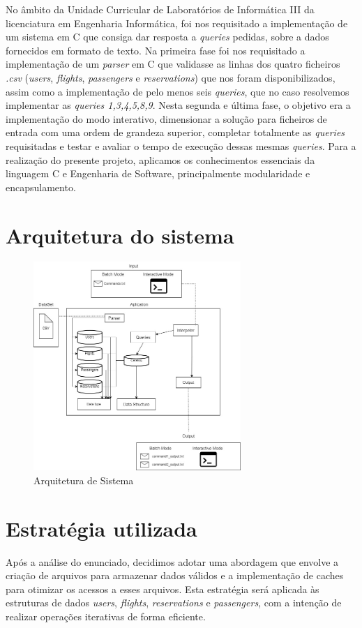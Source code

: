 \documentclass[11pt]{article}
\begin{document}
    No âmbito da Unidade Curricular de Laboratórios de Informática III da licenciatura em Engenharia Informática, foi nos requisitado a implementação de um sistema em C que consiga dar resposta a \textit{queries} pedidas, sobre a dados fornecidos em formato de texto.
    Na primeira fase foi nos requisitado a implementação de um \textit{parser} em C que validasse as linhas dos quatro ficheiros \textit{.csv} (\textit{users}, \textit{flights}, \textit{passengers} e \textit{reservations}) que nos foram disponibilizados, assim como a implementação de pelo menos seis \textit{queries}, que no caso resolvemos implementar as \textit{queries 1,3,4,5,8,9}. 
    Nesta segunda e última fase, o objetivo era a implementação do modo interativo, dimensionar a solução para ficheiros de entrada com uma ordem de grandeza superior, completar totalmente as \textit{queries} requisitadas e testar e avaliar o tempo de execução dessas mesmas \textit{queries}.
    Para a realização do presente projeto, aplicamos os conhecimentos essenciais da linguagem C e Engenharia de Software, principalmente modularidade e encapsulamento.

\section{Arquitetura do sistema}

\begin{figure}[hbt!]
        \centering
        \includegraphics[width=0.7\textwidth]{Imagens/Estrutura.png}
        \caption{Arquitetura de Sistema}
        \label{fig:example}
    \end{figure}

\section{Estratégia utilizada}
    Após a análise do enunciado, decidimos adotar uma abordagem que envolve a criação de arquivos para armazenar dados válidos e a implementação de caches para otimizar os acessos a esses arquivos. Esta estratégia será aplicada às estruturas de dados \textit{users}, \textit{flights}, \textit{reservations} e \textit{passengers}, com a intenção de realizar operações iterativas de forma eficiente.
\end{document}

